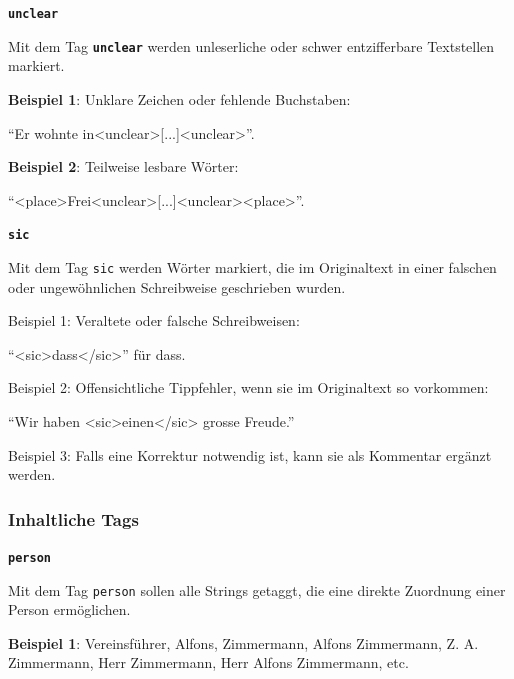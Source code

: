 \documentclass[12pt, a4paper, ngerman, bidi=default]{article}
\begin{document}
\begin{description}
\begin{description}
    
    \item \textbf{\colorbox{unclear}{\texttt{unclear}}}
    

    Mit dem Tag \texttt{\texttt{\textbf{{\colorbox{unclear}{unclear}}}}} werden unleserliche oder schwer entzifferbare Textstellen markiert. 

    
    \noindent\textbf{ Beispiel 1}: Unklare Zeichen oder fehlende Buchstaben: 

    \colorbox{VeryLightGray}{\enquote{Er wohnte in\textless unclear\textgreater [...]\textless unclear\textgreater}.}

    \textbf{ Beispiel 2}: Teilweise lesbare Wörter:

    \colorbox{VeryLightGray}{\enquote{{\textless place\textgreater Frei\textless unclear\textgreater [...]\textless unclear\textgreater \textless place\textgreater}}.}
    
    \item\texttt{\textbf{{\colorbox{sic}{sic}}}} 

    Mit dem Tag \texttt{sic} werden Wörter markiert, die im Originaltext in einer falschen oder ungewöhnlichen Schreibweise geschrieben wurden. 
    
    \noindent{} Beispiel 1: Veraltete oder falsche Schreibweisen: 

    \colorbox{VeryLightGray}{\enquote{{<sic>dass</sic>}} für dass.}

     Beispiel 2: Offensichtliche Tippfehler, wenn sie im Originaltext so vorkommen: 

    \colorbox{VeryLightGray}{\enquote{Wir haben {<sic>einen</sic>} grosse Freude.}}

     Beispiel 3: Falls eine Korrektur notwendig ist, kann sie als Kommentar ergänzt werden. 

    \end{description}

    \subsubsection{Inhaltliche Tags}
    
    \item \textbf{\colorbox{person}{\texttt{person}}}
        
    Mit dem Tag \texttt{\colorbox{person}{person}} sollen alle Strings getaggt, die eine direkte Zuordnung einer Person ermöglichen.
    
    \noindent \textbf{ Beispiel 1}: Vereinsführer, Alfons, Zimmermann, Alfons Zimmermann, Z. A. Zimmermann, Herr Zimmermann, Herr Alfons Zimmermann, etc. 


\end{description}
\end{document}

